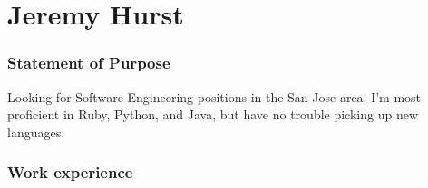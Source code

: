 \documentclass[oldfontcommands]{tccv}
\begin{document}
\part{Jeremy Hurst}

\section{Statement of Purpose}

Looking for Software Engineering positions in the San Jose area.
I'm most proficient in Ruby, Python, and Java, but have no trouble picking up new languages.

\section{Work experience}
\end{document}
